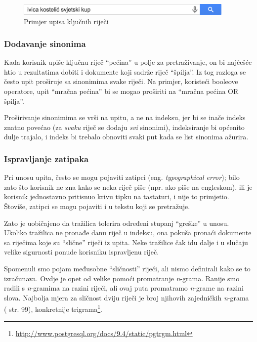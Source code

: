 \documentclass[a4paper,twoside,12pt]{scrreprt}
\begin{document}
\begin{figure}[H]
  \centering
  \includegraphics[width=300pt]{keywords}
  \caption{Primjer upisa ključnih riječi}
  \label{keywords}
\end{figure}

\subsubsection{Dodavanje sinonima}

Kada korisnik upiše ključnu riječ ``pećina'' u polje za pretraživanje, on bi najčešće htio u rezultatima dobiti i dokumente koji sadrže riječ ``špilja''. Iz tog razloga se često upit proširuje sa sinonimima svake riječi. Na primjer, koristeći booleove operatore, upit ``mračna pećina'' bi se mogao proširiti na ``mračna pećina OR špilja''.

Proširivanje sinonimima se vrši na upitu, a ne na indeksu, jer bi se inače indeks znatno povećao (za \textit{svaku} riječ se dodaju \textit{svi} sinonimi), indeksiranje bi općenito dulje trajalo, i indeks bi trebalo obnoviti svaki put kada se list sinonima ažurira.

\subsubsection{Ispravljanje zatipaka}

Pri unosu upita, često se mogu pojaviti zatipci (eng. \textit{typographical error}); bilo zato što korisnik ne zna kako se neka riječ piše (npr. ako piše na engleskom), ili je korisnik jednostavno pritisnuo krivu tipku na tastaturi, i nije to primjetio. Štoviše, zatipci se mogu pojaviti i u tekstu koji se pretražuje.

Zato je uobičajeno da tražilica tolerira određeni stupanj ``greške'' u unosu. Ukoliko tražilica ne pronađe danu riječ u indeksu, ona pokuša pronaći dokumente sa riječima koje su ``slične'' riječi iz upita. Neke tražilice čak idu dalje i u slučaju velike sigurnosti ponude korisniku ispravljenu riječ.

Spomenuli smo pojam međusobne ``sličnosti'' riječi, ali nismo definirali kako se to izračunava. Ovdje je opet od velike pomoći promatranje \textit{n}-grama. Ranije smo radili s \textit{n}-gramima na razini riječi, ali ovaj puta promatramo \textit{n}-grame na razini slova. Najbolja mjera za sličnost dviju riječi je broj njihovih zajedničkih \textit{n}-grama (\cite{taming} str. 99), konkretnije trigrama\footnote{\url{http://www.postgresql.org/docs/9.4/static/pgtrgm.html}}.
\end{document}
